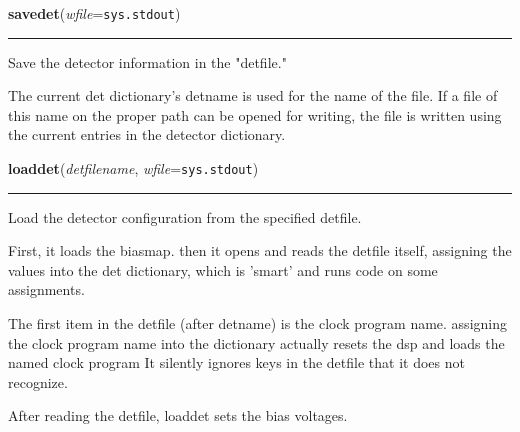     \begin{boxedminipage}{\textwidth}

    \raggedright \textbf{savedet}(\textit{wfile}=\texttt{sys.stdout})

    \vspace{-1.5ex}

    \rule{\textwidth}{0.5\fboxrule}
    Save the detector information in the "detfile."

    The current det dictionary's detname is used for the name of the file. 
    If a file of this name on the proper path can be opened for writing, 
    the file is written using the current entries in the detector 
    dictionary.

    \vspace{1ex}

    \end{boxedminipage}

    \label{det:loaddet}

    \vspace{0.5ex}

    \begin{boxedminipage}{\textwidth}

    \raggedright \textbf{loaddet}(\textit{detfilename}, \textit{wfile}=\texttt{sys.stdout})

    \vspace{-1.5ex}

    \rule{\textwidth}{0.5\fboxrule}
    Load the detector configuration from the specified detfile.

    First, it loads the biasmap. then it opens and reads the detfile 
    itself, assigning the values into the det dictionary, which is 'smart' 
    and runs code on some assignments.

    The first item in the detfile (after detname) is the clock program 
    name. assigning the clock program name into the dictionary actually 
    resets the dsp and loads the named clock program It silently ignores 
    keys in the detfile that it does not recognize.

    After reading the detfile, loaddet sets the bias voltages.

    \vspace{1ex}

    \end{boxedminipage}

    \label{det:powerup}

